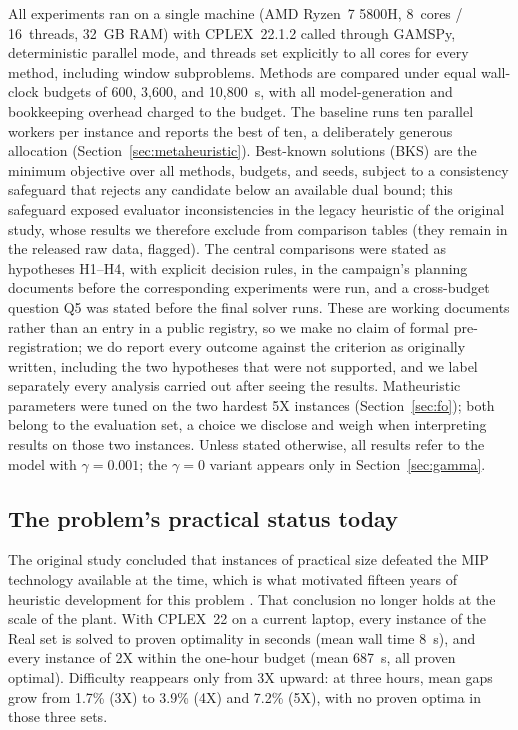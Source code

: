 All experiments ran on a single machine (AMD Ryzen~7 5800H, 8~cores /
16~threads, 32~GB RAM) with CPLEX~22.1.2 called through GAMSPy,
deterministic parallel mode, and threads set explicitly to all cores
for every method, including window subproblems. Methods are compared
under equal wall-clock budgets of 600, 3{,}600, and 10{,}800~s, with all model-generation and bookkeeping overhead charged to the
budget. The \ILS{} baseline runs ten parallel workers per instance
and reports the best of ten, a deliberately generous allocation
(Section~\ref{sec:metaheuristic}). Best-known solutions (BKS) are
the minimum objective over all methods, budgets, and seeds, subject
to a consistency safeguard that rejects any candidate below an
available dual bound; this safeguard exposed evaluator
inconsistencies in the legacy heuristic of the original study, whose
results we therefore exclude from comparison tables (they remain in
the released raw data, flagged). The central comparisons were stated
as hypotheses H1--H4, with explicit decision rules, in the campaign's
planning documents before the corresponding experiments were run, and
a cross-budget question Q5 was stated before the final solver runs.
These are working documents rather than an entry in a public
registry, so we make no claim of formal pre-registration; we do report
every outcome against the criterion as originally written, including
the two hypotheses that were not supported, and we label separately
every analysis carried out after seeing the results. Matheuristic
parameters were tuned on the two hardest 5X instances
(Section~\ref{sec:fo}); both belong to the evaluation set, a choice
we disclose and weigh when interpreting results on those two
instances. Unless stated otherwise, all results refer to the model
with $\gamma=0.001$; the $\gamma=0$ variant appears only in
Section~\ref{sec:gamma}.

\subsection{The problem's practical status today}
\label{sec:progress}

The original study concluded that instances of practical size defeated
the MIP technology available at the time, which is what motivated
fifteen years of heuristic development for this problem
\citep{luche2009combining}. That conclusion no longer holds at the
scale of the plant. With CPLEX~22 on a current laptop, every instance
of the Real set is solved to proven optimality in seconds (mean wall
time 8~s), and every instance of 2X within the one-hour budget (mean
687~s, all proven optimal). Difficulty reappears only from 3X upward:
at three hours, mean gaps grow from 1.7\% (3X) to 3.9\% (4X) and 7.2\%
(5X), with no proven optima in those three sets.

